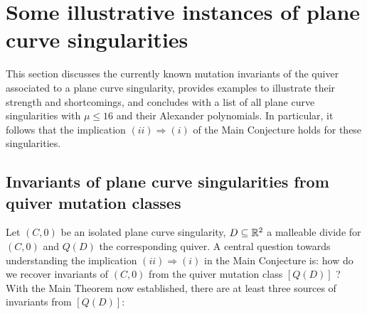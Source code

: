 \color{black}
\section{Some illustrative instances of plane curve singularities}\label{sec:illustrative_examples}

This section discusses the currently known mutation invariants of the quiver associated to a plane curve singularity, provides examples to illustrate their strength and shortcomings, and concludes with a list of all plane curve singularities with $\mu\leq16$ and their Alexander polynomials. In particular, it follows that the implication $(ii)\Longrightarrow(i)$ of the Main Conjecture holds for these singularities.

\subsection{Invariants of plane curve singularities from quiver mutation classes}\label{ssec:InvariantsSingularities_MutationClass}

Let $(C,0)$ be an isolated plane curve singularity, $D\subseteq\mathbb R^2$ a malleable divide for $(C,0)$ and $Q(D)$ the corresponding quiver. A central question towards understanding the implication $(ii)\Longrightarrow(i)$ in the Main Conjecture is: how do we recover invariants of $(C,0)$ from the quiver mutation class $[Q(D)]$ ?\\

\noindent With the Main Theorem now established, there are at least three sources of invariants from $[Q(D)]$:

